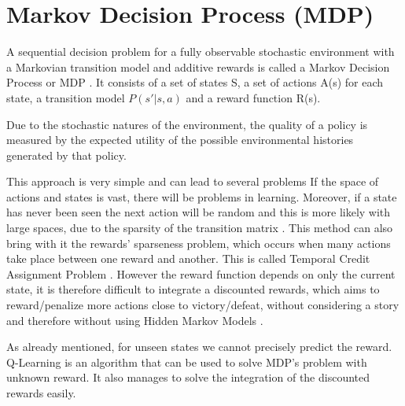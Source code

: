\section{Markov Decision Process (MDP)}
\label{sec:mdp}
A sequential decision problem for a fully observable stochastic environment with a 
Markovian transition model and additive rewards is called a 
Markov Decision Process or MDP \cite{russell2002artificial}.
It consists of a set of states S, a set of actions A(s) for each state, a transition model
$P(s' | s, a)$ and a reward function R(s).

Due to the stochastic natures of the environment, the quality of a policy is measured by the expected utility of the possible environmental histories generated by that policy.

This approach is very simple and can lead to several problems
If the space of actions and states is vast, there will be problems in learning.
Moreover, if a state has never been seen the next action will be random and this is more
likely with large spaces, due to the sparsity of the transition matrix \cite{silver2015}.
This method can also bring with it the rewards' sparseness problem, which occurs when many
actions take place between one reward and another. This is called Temporal Credit Assignment Problem \cite{sutton1984temporal}.
However the reward function depends on only the current state, it is
therefore difficult to integrate a discounted rewards, which aims to reward/penalize
more actions close to victory/defeat, without considering a story and therefore
without using Hidden Markov Models \cite{silver2015}.

As already mentioned, for unseen states we cannot precisely predict the reward.
Q-Learning is an algorithm that can be used to solve MDP's problem with unknown reward.
It also manages to solve the integration of the discounted rewards easily.
